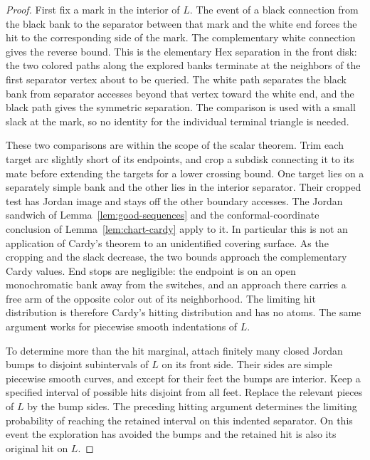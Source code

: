 \begin{proof}
First fix a mark in the interior of $L$.  The event of a black
connection from the black bank to the separator between that mark
and the white end forces the hit to the corresponding side of the
mark.  The complementary white connection gives the reverse bound.
This is the elementary Hex separation in the front disk: the two
colored paths along the explored banks terminate at the neighbors
of the first separator vertex about to be queried.  The white
path separates the black bank from separator accesses beyond that
vertex toward the white end, and the black path gives the symmetric
separation.  The comparison is used with a small slack at the
mark, so no identity for the individual terminal triangle is
needed.

These two comparisons are within the scope of the scalar theorem.
Trim each target arc slightly short of its endpoints, and crop a
subdisk connecting it to its mate before extending the targets for
a lower crossing bound.  One target lies on a separately simple
bank and the other lies in the interior separator.  Their cropped
test has Jordan image and stays off the other boundary accesses.
The Jordan sandwich of Lemma~\ref{lem:good-sequences} and
the conformal-coordinate conclusion of Lemma~\ref{lem:chart-cardy}
apply to it.  In particular this is
not an application of Cardy's theorem to an unidentified covering
surface.  As the cropping and the slack decrease, the two bounds
approach the complementary Cardy values.  End stops are negligible:
the endpoint is on an open monochromatic bank away from the
switches, and an approach there carries a free arm of the opposite
color out of its neighborhood.  The limiting hit distribution is
therefore Cardy's hitting distribution and has no atoms.  The same
argument works for piecewise smooth indentations of $L$.

To determine more than the hit marginal, attach finitely many closed
Jordan bumps to disjoint subintervals of $L$ on its front side.
Their sides are simple piecewise smooth curves, and except for their
feet the bumps are interior.  Keep a specified interval of possible
hits disjoint from all feet.  Replace the relevant pieces of $L$
by the bump sides.  The preceding hitting argument determines the
limiting probability of reaching the retained interval on this
indented separator.  On this event the exploration has avoided the
bumps and the retained hit is also its original hit on $L$.


\end{proof}
